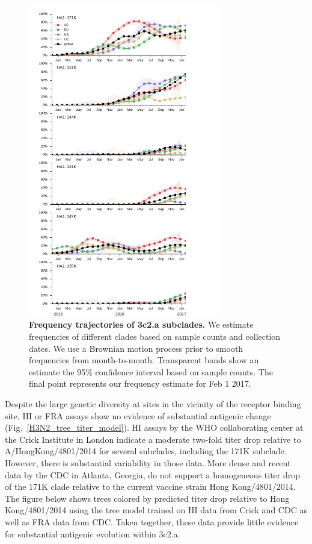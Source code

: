 \documentclass[11pt,oneside,letterpaper]{article}
\begin{document}
\pagebreak

\begin{figure}[H]
	\centering
	\includegraphics[width=0.75\textwidth]{../figures/feb-2017/h3n2_frequencies.pdf}
	\caption{\textbf{Frequency trajectories of 3c2.a subclades.}
	We estimate frequencies of different clades based on sample counts and collection dates.
	We use a Brownian motion process prior to smooth frequencies from month-to-month.
	Transparent bands show an estimate the 95\% confidence interval based on sample counts.
	The final point represents our frequency estimate for Feb 1 2017.
	}
	\label{H3N2_mutations}
\end{figure}

\pagebreak

Despite the large genetic diversity at sites in the vicinity of the receptor binding site, HI or FRA assays show no evidence of substantial antigenic change (Fig.\ \ref{H3N2_tree_titer_model}).
HI assays by the WHO collaborating center at the Crick Institute in London indicate a moderate two-fold titer drop relative to A/HongKong/4801/2014 for several subclades, including the 171K subclade.
However, there is substantial variability in those data.
More dense and recent data by the CDC in Atlanta, Georgia, do not support a homogeneous titer drop of the 171K clade relative to the current vaccine strain Hong Kong/4801/2014.
The figure below shows trees colored by predicted titer drop relative to Hong Kong/4801/2014 using the tree model \cite{neher2015prediction} trained on HI data from Crick and CDC as well as FRA data from CDC.
Taken together, these data provide little evidence for substantial antigenic evolution within 3c2.a.
\end{document}
